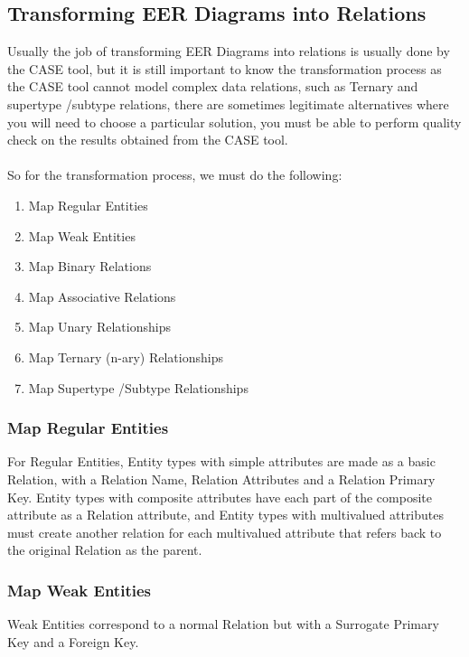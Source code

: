 \documentclass[12pt]{article}
\begin{document}
\subsection{Transforming EER Diagrams into Relations}

Usually the job of transforming EER Diagrams into relations is usually done by the CASE tool, but it is still important to know the transformation process as the CASE tool cannot model complex data relations, such as Ternary and supertype \slash  subtype relations, there are sometimes legitimate alternatives where you will need to choose a particular solution, you must be able to perform quality check on the results obtained from the CASE tool.\\
\\
So for the transformation process, we must do the following:
\begin{enumerate}
	\item{Map Regular Entities}
	\item{Map Weak Entities}
	\item{Map Binary Relations}
	\item{Map Associative Relations}
	\item{Map Unary Relationships}
	\item{Map Ternary (n-ary) Relationships}
	\item{Map Supertype \slash  Subtype Relationships}
\end{enumerate}

\subsubsection{Map Regular Entities}

For Regular Entities, Entity types with simple attributes are made as a basic Relation, with a Relation Name, Relation Attributes and a Relation Primary Key. Entity types with composite attributes have each part of the composite attribute as a Relation attribute, and Entity types with multivalued attributes must create another relation for each multivalued attribute that refers back to the original Relation as the parent.

\subsubsection{Map Weak Entities}

Weak Entities correspond to a normal Relation but with a Surrogate Primary Key and a Foreign Key.
\end{document}
